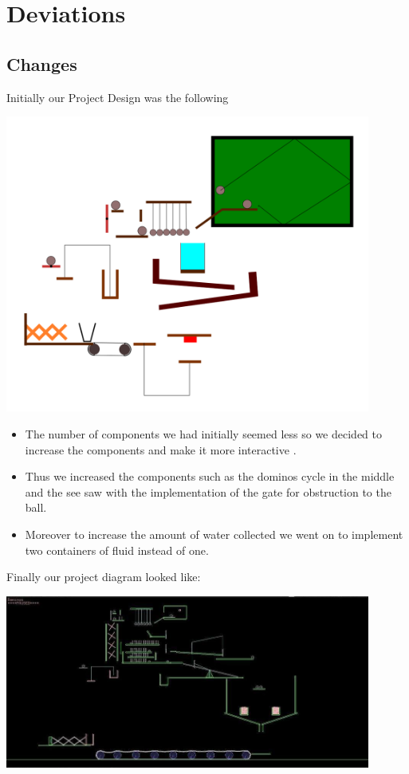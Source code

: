 \documentclass[]{report}
\begin{document}
\chapter{Deviations}
\section{Changes}
Initially our Project Design was the following
\begin{center}
\includegraphics[width=12cm]{img/img}
\end{center}
\begin{itemize}
\item The number of components we had initially seemed less so we decided to increase the components and make it more interactive .
\item Thus we increased the components such as the dominos cycle in the middle and the see saw with the implementation of the gate for obstruction to the ball.
\item Moreover to increase the amount of water collected we went on to implement two containers of fluid instead of one.
\end{itemize}
Finally our project diagram looked like:
\begin{center}
\includegraphics[width=12cm]{img/whole}
\end{center}
\end{document}
